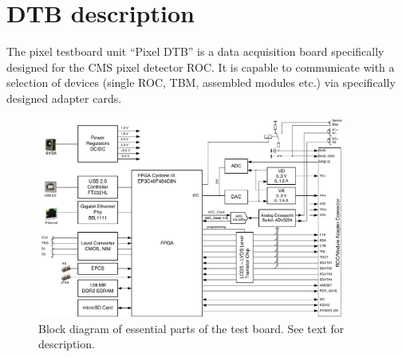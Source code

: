 \chapter{DTB description}

The pixel testboard unit \enquote{Pixel DTB} is a data acquisition board specifically designed for the CMS pixel detector \gls{ROC}. It is capable to communicate with a selection of devices (single \gls{ROC}, \gls{TBM}, assembled modules etc.) via specifically designed adapter cards.
\begin{figure}[hbtp]
    \begin{center}
	\includegraphics[width=0.9\textwidth]{img/DTB_Diagram.pdf}
	\caption{Block diagram of essential parts of the test board. See text for description.}
	\label{fig:DTBDiagram}
    \end{center}
\end{figure}


